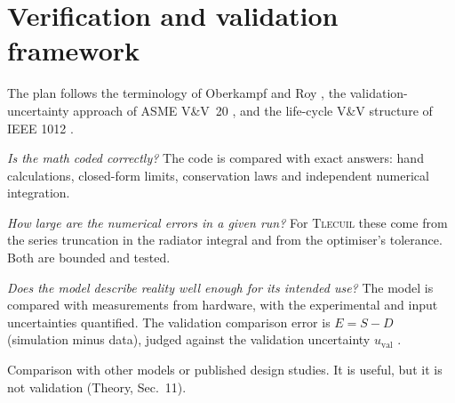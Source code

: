 \documentclass[11pt]{article}
\newcommand{\tlecuil}{\textsc{Tlecuil}}
\begin{document}
\section{Verification and validation framework}\label{sec:framework}
The plan follows the terminology of Oberkampf and Roy \cite{oberkampf2010vv}, the
validation-uncertainty approach of ASME V\&V~20 \cite{asme_vv20}, and the life-cycle V\&V
structure of IEEE 1012 \cite{ieee1012_2024}.
\begin{description}[style=nextline]
  \item[Code verification] \emph{Is the math coded correctly?} The code is compared with
        exact answers: hand calculations, closed-form limits, conservation laws and
        independent numerical integration.
  \item[Solution verification] \emph{How large are the numerical errors in a given run?} For
        \tlecuil{} these come from the series truncation in the radiator integral and from
        the optimiser's tolerance. Both are bounded and tested.
  \item[Validation] \emph{Does the model describe reality well enough for its intended
        use?} The model is compared with measurements from hardware, with the experimental
        and input uncertainties quantified. The validation comparison error is $E=S-D$
        (simulation minus data), judged against the validation uncertainty $u_\text{val}$
        \cite{asme_vv20}.
  \item[Benchmarking] Comparison with other models or published design studies. It is
        useful, but it is not validation (Theory, Sec.~11).
\end{description}

\end{document}

